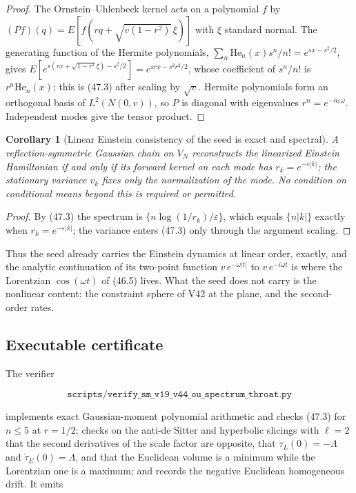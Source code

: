 \documentclass[11pt]{article}
\newtheorem{corollary}[theorem]{Corollary}
\theoremstyle{remark}
\begin{document}
\begin{proof}
The Ornstein--Uhlenbeck kernel acts on a polynomial \(f\) by
\((Pf)(q)=E[f(rq+\sqrt{v(1-r^2)}\,\xi)]\) with \(\xi\) standard normal.
The generating function of the Hermite polynomials,
\(\sum_n\mathrm{He}_n(x)s^n/n!=e^{sx-s^2/2}\), gives
\(E[e^{s(rx+\sqrt{1-r^2}\xi)-s^2/2}]=e^{srx-s^2r^2/2}\), whose
coefficient of \(s^n/n!\) is \(r^n\mathrm{He}_n(x)\); this is (47.3)
after scaling by \(\sqrt v\).  Hermite polynomials form an orthogonal
basis of \(L^2(N(0,v))\), so \(P\) is diagonal with eigenvalues
\(r^n=e^{-n\varepsilon\omega}\).  Independent modes give the tensor
product.
\end{proof}

\begin{corollary}[Linear Einstein consistency of the seed is exact and spectral]
\label{cor:v19v44-consistency}
A reflection-symmetric Gaussian chain on \(V_N\) reconstructs the
linearized Einstein Hamiltonian if and only if its forward kernel on
each mode has \(r_k=e^{-\varepsilon|k|}\); the stationary variance
\(v_k\) fixes only the normalization of the mode.  No condition on
conditional means beyond this is required or permitted.
\end{corollary}

\begin{proof}
By (47.3) the spectrum is \(\{n\log(1/r_k)/\varepsilon\}\), which
equals \(\{n|k|\}\) exactly when \(r_k=e^{-\varepsilon|k|}\); the
variance enters (47.3) only through the argument scaling.
\end{proof}

Thus the seed already carries the Einstein dynamics at linear order,
exactly, and the analytic continuation of its two-point function
\(v\,e^{-\omega|t|}\) to \(v\,e^{-i\omega t}\) is where the Lorentzian
\(\cos(\omega t)\) of (46.5) lives.  What the seed does not carry is the
nonlinear content: the constraint sphere of V42 at the plane, and the
second-order rates.

\subsection{Executable certificate}

The verifier

\[
 \texttt{scripts/verify\_sm\_v19\_v44\_ou\_spectrum\_throat.py}     \tag{47.4}
\]

implements exact Gaussian-moment polynomial arithmetic and checks
(47.3) for \(n\leq5\) at \(r=1/2\); checks on the anti-de Sitter and
hyperbolic slicings with \(\ell=2\) that the second derivatives of the
scale factor are opposite, that \(\dot\tau_L(0)=-\Lambda\) and
\(\dot\tau_E(0)=\Lambda\), and that the Euclidean volume is a minimum
while the Lorentzian one is a maximum; and records the negative
Euclidean homogeneous drift.  It emits
\end{document}
